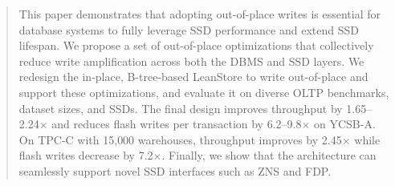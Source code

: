 \begin{abstract}
This paper demonstrates that adopting out-of-place writes is essential for database systems to fully leverage SSD performance and extend SSD lifespan.
We propose a set of out-of-place optimizations that collectively reduce write amplification across both the DBMS and SSD layers.
We redesign the in-place, B-tree-based LeanStore to write out-of-place and support these optimizations, and evaluate it on diverse OLTP benchmarks, dataset sizes, and SSDs.
The final design improves throughput by 1.65--2.24$\times$ and reduces flash writes per transaction by 6.2--9.8$\times$ on YCSB-A.
On TPC-C with 15{,}000 warehouses, throughput improves by 2.45$\times$ while flash writes decrease by 7.2$\times$.
Finally, we show that the architecture can seamlessly support novel SSD interfaces such as ZNS and FDP.
\end{abstract}
